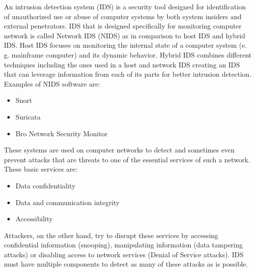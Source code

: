 \documentclass[thesis=B,english]{FITthesis}[2012/10/20]
\begin{document}
An intrusion detection system (IDS) is a security tool designed for identification of unauthorized use or abuse of computer systems by both system insiders and external penetrators\cite{mukherjee1994network}.
IDS that is designed specifically for monitoring computer network is called Network IDS (NIDS) as in comparison to host IDS and hybrid IDS.
Host IDS focuses on monitoring the internal state of a computer system (e. g. mainframe computer) and its dynamic behavior.
Hybrid IDS combines different techniques including the ones used in a host and network IDS creating an IDS that can leverage information from each of its parts for better intrusion detection.
Examples of NIDS software are:                                                    
\begin{itemize}                                                                   
    \item Snort                                                                   
    \item Suricata                                                                
    \item Bro Network Security Monitor                                            
\end{itemize}                                                                     
These systems are used on computer networks to detect and sometimes even prevent attacks that are threats to one of the essential services of such a network.
These basic services are\cite{mukherjee1994network:1}:                            
\begin{itemize}                                                                   
    \item Data confidentiality                                                    
    \item Data and communication integrity                                        
    \item Accessibility                                                           
\end{itemize}                                                                     
Attackers, on the other hand, try to disrupt these services by accessing confidential information (snooping), manipulating information (data tampering attacks) or disabling access to network services (Denial of Service attacks).
IDS must have multiple components to detect as many of these attacks as is possible.
\end{document}
